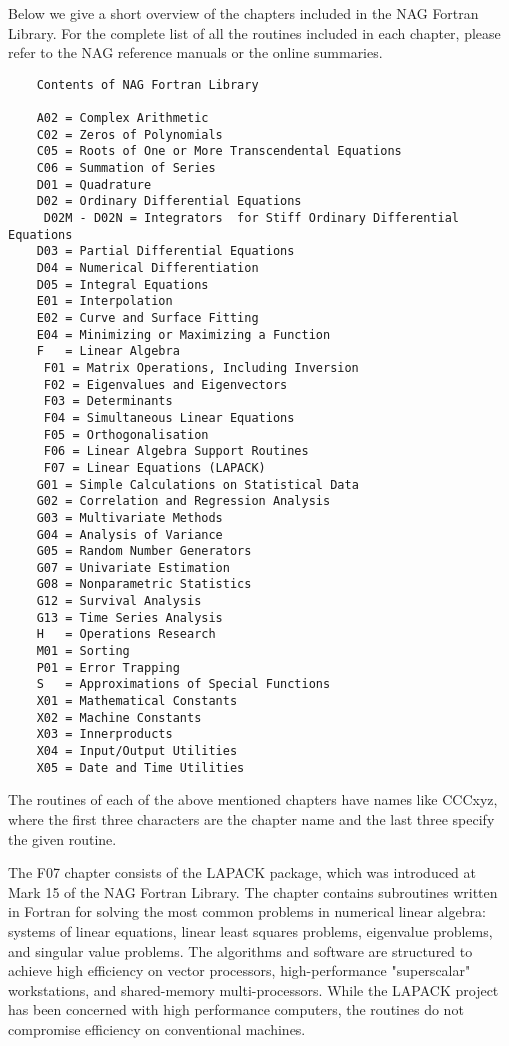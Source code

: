 Below  we give  a short  overview  of the  chapters included  in the  NAG
Fortran Library.  For  the complete list of all the  routines included in
each chapter,  please refer to  the NAG  reference manuals or  the online
summaries.
 
 
\begin{verbatim}
    Contents of NAG Fortran Library
 
    A02 = Complex Arithmetic
    C02 = Zeros of Polynomials
    C05 = Roots of One or More Transcendental Equations
    C06 = Summation of Series
    D01 = Quadrature
    D02 = Ordinary Differential Equations
     D02M - D02N = Integrators  for Stiff Ordinary Differential Equations
    D03 = Partial Differential Equations
    D04 = Numerical Differentiation
    D05 = Integral Equations
    E01 = Interpolation
    E02 = Curve and Surface Fitting
    E04 = Minimizing or Maximizing a Function
    F   = Linear Algebra
     F01 = Matrix Operations, Including Inversion
     F02 = Eigenvalues and Eigenvectors
     F03 = Determinants
     F04 = Simultaneous Linear Equations
     F05 = Orthogonalisation
     F06 = Linear Algebra Support Routines
     F07 = Linear Equations (LAPACK)
    G01 = Simple Calculations on Statistical Data
    G02 = Correlation and Regression Analysis
    G03 = Multivariate Methods
    G04 = Analysis of Variance
    G05 = Random Number Generators
    G07 = Univariate Estimation
    G08 = Nonparametric Statistics
    G12 = Survival Analysis
    G13 = Time Series Analysis
    H   = Operations Research
    M01 = Sorting
    P01 = Error Trapping
    S   = Approximations of Special Functions
    X01 = Mathematical Constants
    X02 = Machine Constants
    X03 = Innerproducts
    X04 = Input/Output Utilities
    X05 = Date and Time Utilities
\end{verbatim}
 
The routines  of each  of the  above mentioned  chapters have  names like
CCCxyz, where the first three characters are the chapter name and the
last three specify the given routine.
 
The F07 chapter consists of the  LAPACK package, which was introduced at
Mark 15 of the NAG Fortran Library. The chapter contains
subroutines written in Fortran for solving
the most common problems in numerical linear algebra:
systems of linear equations, linear least squares problems,
eigenvalue problems, and singular value problems.
The algorithms and software are structured to achieve high
efficiency on vector processors, high-performance "superscalar"
workstations, and shared-memory multi-processors.
While the LAPACK project has been concerned with high performance
computers, the routines do not compromise efficiency on conventional
machines.
 
